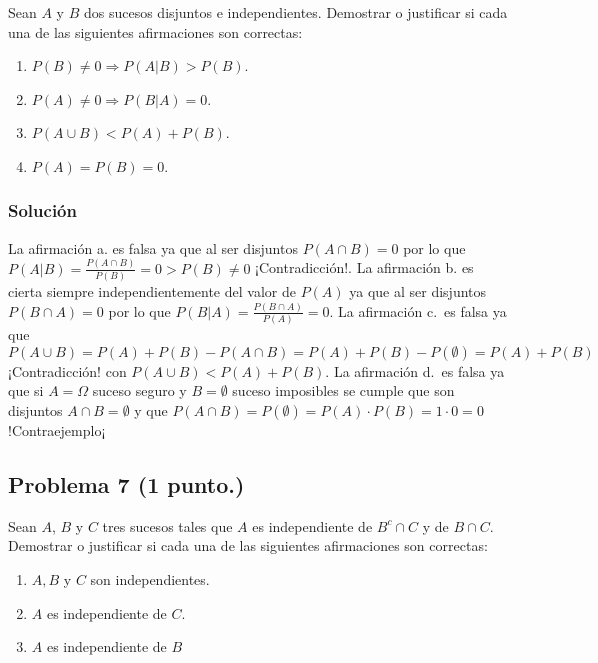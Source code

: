 \documentclass[
]{article}
\providecommand{\tightlist}{%
  \setlength{\itemsep}{0pt}\setlength{\parskip}{0pt}}
\begin{document}
Sean \(A\) y \(B\) dos sucesos disjuntos e independientes. Demostrar o
justificar si cada una de las siguientes afirmaciones son correctas:

\begin{enumerate}
\def\labelenumi{\alph{enumi}.}
\tightlist
\item
  \(P(B)\neq 0 \Rightarrow P(A|B)> P(B)\).
\item
  \(P(A)\neq 0 \Rightarrow P(B|A)=0\).
\item
  \(P(A\cup B)< P(A)+P(B)\).
\item
  \(P(A)=P(B)=0\).
\end{enumerate}

\hypertarget{soluciuxf3n-4}{%
\subsubsection{Solución}\label{soluciuxf3n-4}}

La afirmación a. es falsa ya que al ser disjuntos \(P(A\cap B)=0\) por
lo que \(P(A|B)=\frac{P(A\cap B)}{P(B)}=0>P(B)\neq 0\) ¡Contradicción!.
La afirmación b. es cierta siempre independientemente del valor de
\(P(A)\) ya que al ser disjuntos \(P(B\cap A)=0\) por lo que
\(P(B|A)=\frac{P(B\cap A)}{P(A)}=0\). La afirmación c.~es falsa ya que
\(P(A\cup B)=P(A)+P(B)-P(A\cap B)=P(A)+P(B)-P(\emptyset)=P(A)+P(B)\)
¡Contradicción! con \(P(A\cup B)< P(A)+P(B)\). La afirmación d.~es falsa
ya que si \(A=\Omega\) suceso seguro y \(B=\emptyset\) suceso imposibles
se cumple que son disjuntos \(A\cap B=\emptyset\) y que
\(P(A\cap B)=P(\emptyset)=P(A)\cdot P(B)=1\cdot 0=0\) !Contraejemplo¡

\hypertarget{problema-7}{%
\subsection{\texorpdfstring{Problema 7
(\textbf{1 punto.})}{Problema 7 ()}}\label{problema-7}}

Sean \(A\), \(B\) y \(C\) tres sucesos tales que \(A\) es independiente
de \(B^c\cap C\) y de \(B\cap C\). Demostrar o justificar si cada una de
las siguientes afirmaciones son correctas:

\begin{enumerate}
\def\labelenumi{\alph{enumi}.}
\tightlist
\item
  \(A,B\) y \(C\) son independientes.
\item
  \(A\) es independiente de \(C\).
\item
  \(A\) es independiente de \(B\)
\end{enumerate}
\end{document}
